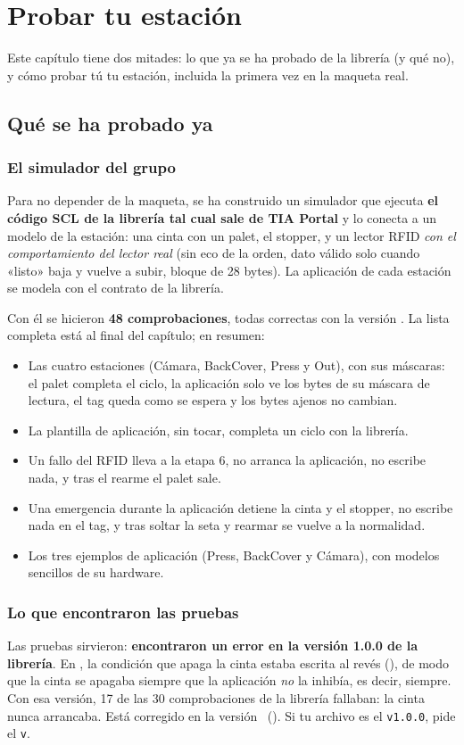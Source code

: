 \chapter{Probar tu estación}\label{cap:pruebas}

Este capítulo tiene dos mitades: lo que ya se ha probado de la librería (y qué no), y cómo probar tú tu estación, incluida la primera vez en la maqueta real.

\section{Qué se ha probado ya}
\subsection{El simulador del grupo}
Para no depender de la maqueta, se ha construido un simulador que ejecuta \textbf{el código SCL de la librería tal cual sale de TIA Portal} y lo conecta a un modelo de la estación: una cinta con un palet, el stopper, y un lector RFID \emph{con el comportamiento del lector real} (sin eco de la orden, dato válido solo cuando «listo» baja y vuelve a subir, bloque de 28 bytes). La aplicación de cada estación se modela con el contrato de la librería.

Con él se hicieron \textbf{48 comprobaciones}, todas correctas con la versión \vlib. La lista completa está al final del capítulo; en resumen:
\begin{itemize}
\item Las cuatro estaciones (Cámara, BackCover, Press y Out), con sus máscaras: el palet completa el ciclo, la aplicación solo ve los bytes de su máscara de lectura, el tag queda como se espera y los bytes ajenos no cambian.
\item La plantilla de aplicación, sin tocar, completa un ciclo con la librería.
\item Un fallo del RFID lleva a la etapa 6, no arranca la aplicación, no escribe nada, y tras el rearme el palet sale.
\item Una emergencia durante la aplicación detiene la cinta y el stopper, no escribe nada en el tag, y tras soltar la seta y rearmar se vuelve a la normalidad.
\item Los tres ejemplos de aplicación (Press, BackCover y Cámara), con modelos sencillos de su hardware.
\end{itemize}

\subsection{Lo que encontraron las pruebas}
Las pruebas sirvieron: \textbf{encontraron un error en la versión 1.0.0 de la librería}. En , la condición que apaga la cinta estaba escrita al revés (), de modo que la cinta se apagaba siempre que la aplicación \emph{no} la inhibía, es decir, siempre. Con esa versión, 17 de las 30 comprobaciones de la librería fallaban: la cinta nunca arrancaba. Está corregido en la versión \vlib\ (). Si tu archivo es el \texttt{v1.0.0}, pide el \texttt{v\vlib}.

